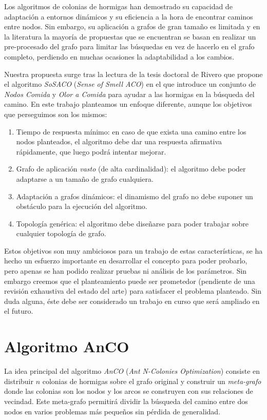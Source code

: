 \documentclass{llncs}
\begin{document}
Los algoritmos de colonias de hormigas han demostrado su capacidad de adaptaci{\'o}n a entornos din{\'a}micos y su eficiencia a la hora de encontrar caminos entre nodos.
Sin embargo, su aplicaci{\'o}n a grafos de gran tama\~{n}o es limitada y en la literatura la mayor{\'i}a de propuestas que se encuentran se basan en realizar un pre-procesado del grafo para limitar las b{\'u}squedas en vez de hacerlo en el grafo completo, perdiendo en muchas ocasiones la adaptabilidad a los cambios.

Nuestra propuesta surge tras la lectura de la tesis doctoral de Rivero \cite{Rivero2011} que propone el algoritmo \textit{SoSACO} (\textit{Sense of Smell ACO}) en el que introduce un conjunto de \textit{Nodos Comida} y \textit{Olor a Comida} para ayudar a las hormigas en la b{\'u}squeda del camino.
En este trabajo planteamos un enfoque diferente, aunque los objetivos que perseguimos son los mismos:
\begin{enumerate}
  \item Tiempo de respuesta m{\'i}nimo: en caso de que exista una camino entre los nodos planteados, el algoritmo debe dar una respuesta afirmativa r{\'a}pidamente, que luego podr{\'a} intentar mejorar.
  \item Grafo de aplicaci{\'o}n \textit{vasto} (de alta cardinalidad): el algoritmo debe poder adaptarse a un tama\~{n}o de grafo cualquiera.
  \item Adaptaci{\'o}n a grafos din{\'a}micos: el dinamismo del grafo no debe suponer un obst{\'a}culo para la ejecuci{\'o}n del algoritmo.
  \item Topolog{\'i}a gen{\'e}rica: el algoritmo debe dise\~{n}arse para poder trabajar sobre cualquier topolog{\'i}a de grafo.
\end{enumerate}

Estos objetivos son muy ambiciosos para un trabajo de estas caracter{\'i}sticas, se ha hecho un esfuerzo importante en desarrollar el concepto para poder probarlo, pero apenas se han podido realizar pruebas ni an{\'a}lisis de los par{\'a}metros.
Sin embargo creemos que el planteamiento puede ser prometedor (pendiente de una revisi{\'o}n exhaustiva del estado del arte) para satisfacer el problema planteado.
Sin duda alguna, {\'e}ste debe ser considerado un trabajo en curso que ser{\'a} ampliado en el futuro.







\section{Algoritmo AnCO}
La idea principal del algoritmo \textit{AnCO} (\textit{Ant N-Colonies Optimization}) consiste en distribuir $n$ colonias de hormigas sobre el grafo original y construir un \textit{meta-grafo} donde las colonias son los nodos y los arcos se construyen con sus relaciones de vecindad.
Este meta-grafo permitir{\'a} dividir la b{\'u}squeda del camino entre dos nodos en varios problemas m{\'a}s peque\~{n}os sin p{\'e}rdida de generalidad.
\end{document}
